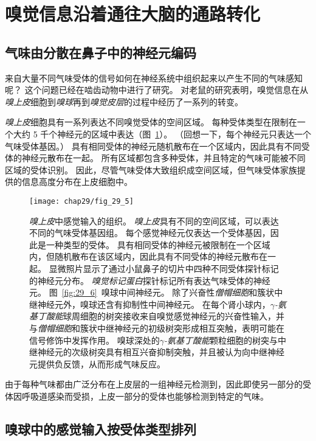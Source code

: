 \section{嗅觉信息沿着通往大脑的通路转化}

\subsection{气味由分散在鼻子中的神经元编码}

来自大量不同气味受体的信号如何在神经系统中组织起来以产生不同的气味感知呢？
这个问题已经在啮齿动物中进行了研究。
对老鼠的研究表明，嗅觉信息在从\textit{嗅上皮}细胞到\textit{嗅球}再到\textit{嗅觉皮层}的过程中经历了一系列的转变。


\textit{嗅上皮}细胞具有一系列表达不同嗅觉受体的空间区域。
每种受体类型在限制在一个大约 5 千个神经元的区域中表达（图~\ref{fig:29_5}）。
（回想一下，每个神经元只表达一个气味受体基因。）
具有相同受体的神经元随机散布在一个区域内，因此具有不同受体的神经元散布在一起。
所有区域都包含多种受体，并且特定的气味可能被不同区域的受体识别。
因此，尽管气味受体大致组织成空间区域，但气味受体家族提供的信息高度分布在上皮细胞中。


\begin{figure}[htbp]
	\centering
	\texttt{[image: chap29/fig\_29\_5]}
	\caption{\textit{嗅上皮}中感觉输入的组织。
		\textit{嗅上皮}具有不同的空间区域，可以表达不同的气味受体基因组。
		每个感觉神经元仅表达一个受体基因，因此是一种类型的受体。
		具有相同受体的神经元被限制在一个区域内，但随机散布在该区域内，因此具有不同受体的神经元散布在一起。
		显微照片显示了通过小鼠鼻子的切片中四种不同受体探针标记的神经元分布。
		\textit{嗅觉标记蛋白}探针标记所有表达气味受体的神经元\cite{ressler1993zonal}。
		图~\ref{fig:29_6}~嗅球中间神经元。
		除了兴奋性\textit{僧帽细胞}和簇状中继神经元外，嗅球还含有抑制性中间神经元。
		在每个肾小球内，\textit{$\gamma$-氨基丁酸能}球周细胞的树突接收来自嗅觉感觉神经元的兴奋性输入，并与\textit{僧帽细胞}和簇状中继神经元的初级树突形成相互突触，表明可能在信号修饰中发挥作用。
		嗅球深处的\textit{$\gamma$-氨基丁酸能}颗粒细胞的树突与中继神经元的次级树突具有相互兴奋抑制突触，并且被认为向中继神经元提供负反馈，从而形成气味反应\cite{haberly1998synaptic}。}
	\label{fig:29_5}
\end{figure}


由于每种气味都由广泛分布在上皮层的一组神经元检测到，因此即使另一部分的受体因呼吸道感染而受损，上皮一部分的受体也能够检测到特定的气味。



\subsection{嗅球中的感觉输入按受体类型排列}

